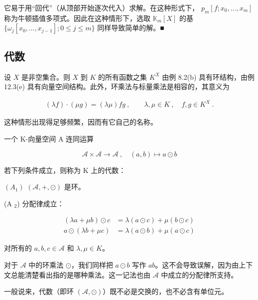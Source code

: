 \begin{remark}
\begin{items}
它易于用“回代”（从顶部开始逐次代入）求解。在这种形式下， $ p_m[f; x_0, \ldots, x_m] $ 称为牛顿插值多项式。因此在这种情形下，选取  $ \mathbb{K}_m[X] $ 的基  $ \{\omega_j[x_0, \ldots, x_{j-1}]; 0 \leq j \leq m\} $ 同样导致简单的解。■

\end{items}

\end{remark}

\subsection*{代数}

设 $X$ 是非空集合。则 $X$ 到 $K$ 的所有函数之集 $K^X$ 由例 8.2(b) 具有环结构，由例 12.3(e) 具有向量空间结构。此外，环乘法与标量乘法是相容的，其意义为

\begin{equation*}
\begin{array}{r}{(\lambda f)\cdot(\mu g)=(\lambda\mu)f g~,\qquad\lambda,\mu\in K~,\quad f,g\in K^{X}~.}\end{array}
\end{equation*}

这种情形出现得足够频繁，因而有它自己的名称。

一个 K-向量空间 A 连同运算

\[
\mathcal{A}\times\mathcal{A}\to\mathcal{A}~,\quad(a,b)\mapsto a\odot b
\]

若下列条件成立，则称为 K 上的代数：

$ (A_1) $  $ (\mathcal{A}, +, \odot) $ 是环。

(A $ _{2} $) 分配律成立：

\begin{equation*}
\begin{aligned}
(\lambda a+\mu b)\odot c&=\lambda(a\odot c)+\mu(b\odot c)\\a\odot(\lambda b+\mu c)&=\lambda(a\odot b)+\mu(a\odot c)
\end{aligned}
\end{equation*}

对所有的  $ a, b, c \in \mathcal{A} $ 和  $ \lambda, \mu \in K $。

对于  $ \mathcal{A} $ 中的环乘法  $ \odot $，我们同样把  $ a \odot b $ 写作  $ ab $。这不会导致误解，因为由上下文总能清楚看出指的是哪种乘法。这一记法也由  $ \mathcal{A} $ 中成立的分配律所支持。

一般说来，代数（即环  $ (\mathcal{A}, \odot) $）既不必是交换的，也不必含有单位元。


